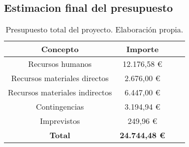 \subsection{Estimacion final del presupuesto}


\begin{table}[H]
    \begin{center}
    \begin{tabular}{|c|c|c|c|}
        \hline
        \textbf{Concepto} & \textbf{Importe}\\ 
        \hline
        Recursos humanos & 12.176,58 € \\
        Recursos materiales directos & 2.676,00 € \\
        Recursos materiales indirectos  & 6.447,00 € \\
        Contingencias & 3.194,94 € \\
        Imprevistos & 249,96 € \\
        \hline
        \textbf{Total} & \textbf{24.744,48 €} \\
        \hline
    \end{tabular}
    \caption{Presupuesto total del proyecto. Elaboración propia.}
    \label{tab:presupuesto_total}
    \end{center}
\end{table}
